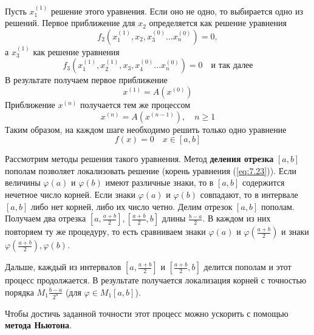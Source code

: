 Пусть $x_1^{(1)}$ решение этого уравнения. Если оно не одно, то выбирается одно из решений. Первое приближение для $x_2$ определяется как решение уравнения
\begin{equation} \label{eq:7.19}
	f_2(x_1^{(1)}, x_2, x_3^{(0)} \dots x_n^{(0)}) = 0,
\end{equation} 
а $x_3^{(1)}$ как решение уравнения
\begin{equation} \label{eq:7.20}
	f_3(x_1^{(1)}, x_2^{(1)}, x_3, x_4^{(0)} \dots x_n^{(0)}) = 0 \quad \textrm{и так далее}
\end{equation} 
В результате получаем первое приближение
\begin{equation} \label{eq:7.21}
	x^{(1)} = A(x^{(0)})
\end{equation} 
Приближение $x^{(n)}$ получается тем же процессом
\begin{equation} \label{eq:7.22}
	x^{(n)} = A(x^{(n-1)}), \quad n \geq 1
\end{equation} 
Таким образом, на каждом шаге необходимо решить только одно уравнение
\begin{equation} \label{eq:7.23}
	f(x) = 0 \quad x \in [a, b]
\end{equation} 

Рассмотрим методы решения такого уравнения. Метод \textbf{деления отрезка} $[a, b]$ пополам позволяет локализовать решение (корень уравнения (\ref{eq:7.23})). Если величины $\varphi(a)$ и $\varphi(b)$ имеют различные знаки, то в $[a, b]$ содержится нечетное число корней. Если знаки $\varphi(a)$ и $\varphi(b)$ совпадают, то в интервале $[a, b]$ либо нет корней, либо их число четно. Делим отрезок $[a, b]$ пополам. Получаем два отрезка $[a, \frac{a+b}{2}], [\frac{a+b}{2}, b]$ длины $\frac{b-a}{2}$. В каждом из них повторяем ту же процедуру, то есть сравниваем знаки $\varphi(a)$ и $\varphi(\frac{a+b}{2})$ и знаки $\varphi(\frac{a+b}{2}), \varphi(b)$.

Дальше, каждый из интервалов $[a, \frac{a+b}{2}]$ и $[\frac{a+b}{2}, b]$ делится пополам и этот процесс продолжается. В результате получается локализация корней с точностью порядка $M_1 \frac{b-a}{2^n}$ (для $\varphi \in M_1[a, b]$). 

Чтобы достичь заданной точности этот процесс можно ускорить с помощью \textbf{метода Ньютона}.

